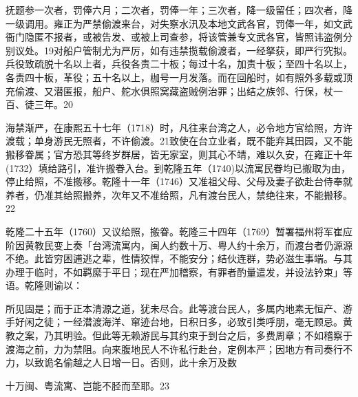 \noindent 抚题参一次者，罚俸六月；二次者，罚俸一年；三次者，降一级留任；四次者，降一级调用。雍正为严禁偷渡来台，对失察水汛及本地文武各官，罚俸一年，如文武衙门隐匿不报者，或被告发、或被上司查参，将该管兼专文武各官，皆照讳盗例分别议处。19对船户管制尤为严厉，如有违禁揽载偷渡者，一经拏获，即严行究拟。兵役致疏脱十名以上者，兵役各责二十板；每过十名，加责十板；至四十名以上，各责四十板，革役；五十名以上，枷号一月发落。而在回船时，如有照外多载或顶充偷渡、又潜匿报，船户、舵水俱照窝藏盗贼例治罪；出结之族邻、行保，杖一百、徒三年。20

海禁渐严，在康熙五十七年（1718）时，凡往来台湾之人，必令地方官给照，方许渡载；单身游民无照者，不许偷渡。21致使在台立业者，既不能弃其田园，又不能搬移眷属；官方恐其等终岁群居，皆无家室，则其心不靖，难以久安，在雍正十年(1732）填给路引，准许搬眷入台。到乾隆五年（1740)以流寓民眷均已搬取为由，停止给照，不准搬移。乾隆十一年（1746）又准祖父母、父母及妻子欲赴台侍奉就养者，仍准其给照搬养，次年又不准给照，凡有渡台民人，禁绝往来，不能搬移。22

乾隆二十五年（1760）又议给照，搬眷。乾隆三十四年（1769）暂署福州将军崔应阶因黄教民变上奏「台湾流寓内，闽人约数十万、粤人约十余万，而渡台者仍源源不绝。此皆穷困逋逃之辈，性情狡悍，不能安分；结伙连群，势必滋生事端。与其办理于临时，不如羁縻于平日；现在严加稽察，有罪者酌量遣发，并设法钤束」等语。乾隆则谕以：

\begin{BookQuote}
所见固是；而于正本清源之道，犹未尽合。此等渡台民人，多属内地素无恒产、游手好闲之徒；一经潜渡海洋、窜迹台地，日积日多，必致引类呼朋，毫无顾忌。黄教之案，乃其明验。但此等无赖游民与其约束于到台之后，多费周章；不如稽察于渡海之前，力为禁阻。向来腹地民人不许私行赴台，定例本严；因地方有司奏行不力，以致诡名偷越之人日增一日。否则，此十余万及数
\end{BookQuote}

\vfill
\begin{BookNotes}
\end{BookNotes}

\begin{BookQuote}
十万闽、粤流寓、岂能不胫而至耶。23
\end{BookQuote}

